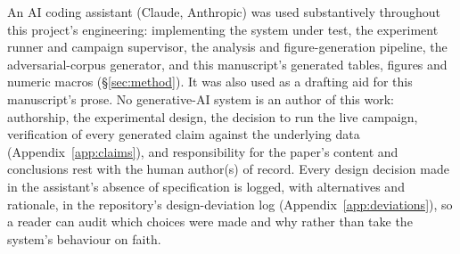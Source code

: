 An AI coding assistant (Claude, Anthropic) was used substantively throughout this project's
engineering: implementing the system under test, the experiment runner and campaign supervisor, the
analysis and figure-generation pipeline, the adversarial-corpus generator, and this manuscript's
generated tables, figures and numeric macros (\S\ref{sec:method}). It was also used as a drafting aid
for this manuscript's prose. No generative-AI system is an author of this work: authorship, the
experimental design, the decision to run the live campaign, verification of every generated claim
against the underlying data (Appendix~\ref{app:claims}), and responsibility for the paper's content
and conclusions rest with the human author(s) of record. Every design decision made in the assistant's
absence of specification is logged, with alternatives and rationale, in the repository's
design-deviation log (Appendix~\ref{app:deviations}), so a reader can audit which choices were made
and why rather than take the system's behaviour on faith.
